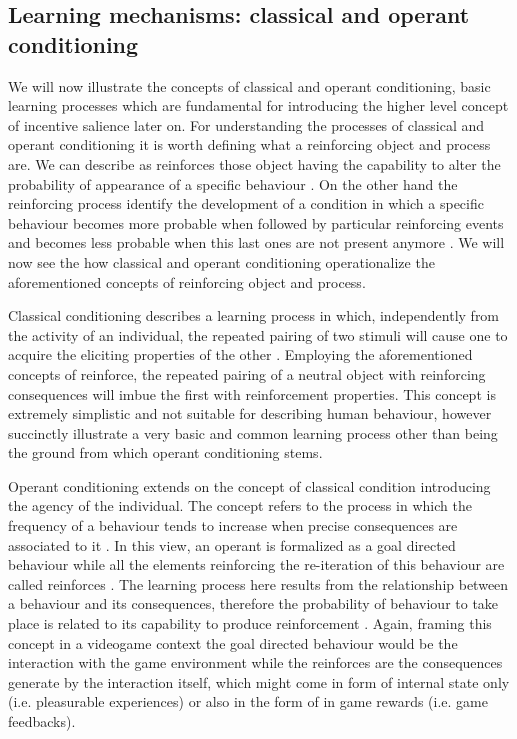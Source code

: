 \subsection{Learning mechanisms: classical and operant conditioning}
\label{classical_operant_cond}
We will now illustrate the concepts of classical and operant conditioning, basic learning processes which are fundamental for introducing the higher level concept of incentive salience later on. For understanding the processes of classical and operant conditioning it is worth defining what a reinforcing object and process are. We can describe as reinforces those object having the capability to alter the probability of appearance of a specific behaviour \cite{kling1971woodworth,skinner1953science,squire2012fundamental}.  On the other hand the reinforcing process identify the development of a condition in which a specific behaviour becomes more probable when followed by particular reinforcing events and becomes less probable when this last ones are not present anymore \cite{kling1971woodworth}. We will now see the how classical and operant conditioning operationalize the aforementioned concepts of reinforcing object and process.

Classical conditioning describes a learning process in which, independently from the activity of an individual, the repeated pairing of two stimuli will cause one to acquire the eliciting properties of the other \cite{squire2012fundamental}. Employing the aforementioned concepts of reinforce, the repeated pairing of a neutral object with reinforcing consequences will imbue the first with reinforcement properties. This concept is extremely simplistic and not suitable for describing human behaviour, however succinctly illustrate a very basic and common learning process other than being the ground from which operant conditioning stems. 

Operant conditioning extends on the concept of classical condition introducing the agency of the individual. The concept refers to the process in which the frequency of a behaviour tends to increase when precise consequences are associated to it \cite{skinner1953science}. In this view, an operant is formalized as a goal directed behaviour while all the elements reinforcing the re-iteration of this behaviour are called reinforces \cite{skinner1953science}. The learning process here results from the relationship between a behaviour and its consequences, therefore the probability of behaviour to take place is related to its capability to produce reinforcement \cite{kling1971woodworth}. Again, framing this concept in a videogame context the goal directed behaviour would be the interaction with the game environment while the reinforces are the consequences generate by the interaction itself, which might come in form of internal state only (i.e. pleasurable experiences) or also in the form of in game rewards (i.e. game feedbacks). 

